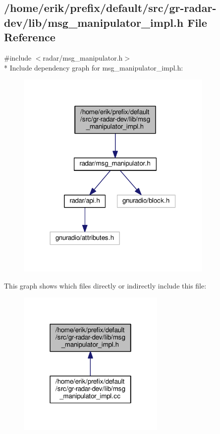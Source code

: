 \subsection{/home/erik/prefix/default/src/gr-\/radar-\/dev/lib/msg\+\_\+manipulator\+\_\+impl.h File Reference}
\label{msg__manipulator__impl_8h}
{\ttfamily \#include $<$radar/msg\+\_\+manipulator.\+h$>$}\\*
Include dependency graph for msg\+\_\+manipulator\+\_\+impl.\+h\+:
\nopagebreak
\begin{figure}[H]
\begin{center}
\leavevmode
\includegraphics[width=270pt]{dc/de9/msg__manipulator__impl_8h__incl}
\end{center}
\end{figure}
This graph shows which files directly or indirectly include this file\+:
\nopagebreak
\begin{figure}[H]
\begin{center}
\leavevmode
\includegraphics[width=202pt]{dd/de0/msg__manipulator__impl_8h__dep__incl}
\end{center}
\end{figure}
